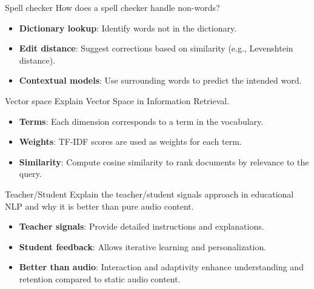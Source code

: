 \documentclass{article}
\begin{document}
\begin{exercise}{Spell checker}
  How does a spell checker handle non-words?

  \begin{solution}
    \begin{itemize}
        \item \textbf{Dictionary lookup}: Identify words not in the dictionary.
        \item \textbf{Edit distance}: Suggest corrections based on similarity (e.g., Levenshtein distance).
        \item \textbf{Contextual models}: Use surrounding words to predict the intended word.
    \end{itemize}
  \end{solution}
\end{exercise}

\begin{exercise}{Vector space}
  Explain Vector Space in Information Retrieval.

  \begin{solution}
    \begin{itemize}
        \item \textbf{Terms}: Each dimension corresponds to a term in the vocabulary.
        \item \textbf{Weights}: TF-IDF scores are used as weights for each term.
        \item \textbf{Similarity}: Compute cosine similarity to rank documents by relevance to the query.
    \end{itemize}
  \end{solution}
\end{exercise}

\begin{exercise}{Teacher/Student}
  Explain the teacher/student signals approach in educational NLP and why it is better than pure audio content.

  \begin{solution}
    \begin{itemize}
        \item \textbf{Teacher signals}: Provide detailed instructions and explanations.
        \item \textbf{Student feedback}: Allows iterative learning and personalization.
        \item \textbf{Better than audio}: Interaction and adaptivity enhance understanding and retention compared to static audio content.
    \end{itemize}
  \end{solution}
\end{exercise}
\end{document}

